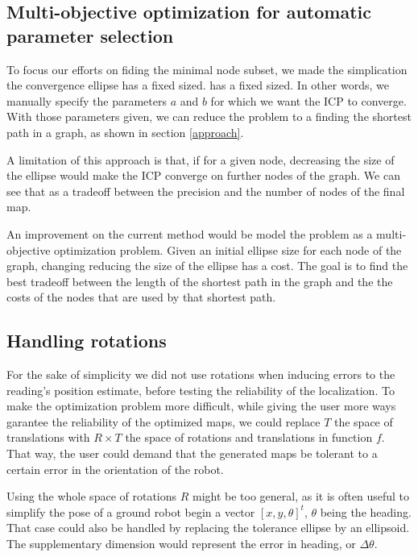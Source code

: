 \documentclass[letterpaper,10 pt,conference]{ieeeconf}
\begin{document}
\subsection{Multi-objective optimization for automatic parameter selection}

To focus our efforts on fiding the minimal node subset, we made the simplication the convergence ellipse has a fixed sized.
has a fixed sized.  In other words, we manually specify the parameters $a$ and $b$ for which we
want the ICP to converge. With those parameters given, we can reduce the problem to a finding the
shortest path in a graph, as shown in section \ref{approach}.


A limitation of this approach is that, if for a given node, decreasing the size of the ellipse would
make the ICP converge on further nodes of the graph. We can see that as a tradeoff between the
precision and the number of nodes of the final map.


An improvement on the current method would be model the problem as a multi-objective optimization
problem. Given an initial ellipse size for each node of the graph, changing reducing the size of the
ellipse has a cost. The goal is to find the best tradeoff between the length of the shortest path in
the graph and the the costs of the nodes that are used by that shortest path.

\subsection{Handling rotations}

For the sake of simplicity we did not use rotations when inducing errors to the reading's
position estimate, before testing the reliability of the localization. To make the optimization
problem more difficult, while giving the user more ways garantee the reliability of the optimized
maps, we could replace $T$ the space of translations with $R \times T$ the space of rotations and
translations in function $f$. That way, the user could demand that the generated maps be tolerant to
a certain error in the orientation of the robot.

Using the whole space of rotations $R$ might be too general, as it is often useful to simplify the pose of a
ground robot begin a vector $[x, y, \theta]^t$, $\theta$ being the heading. That case could also be
handled by replacing the tolerance ellipse by an ellipsoid. The supplementary dimension would
represent the error in heading, or $\Delta \theta$.
\end{document}

